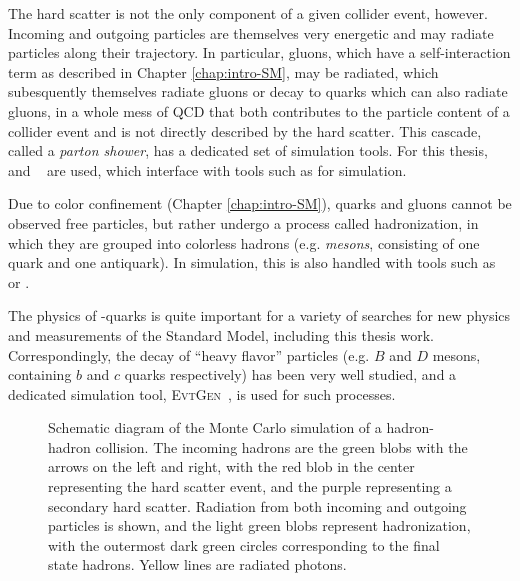 The hard scatter is not the only component of a given collider event, however. Incoming and outgoing 
particles are themselves very energetic and may radiate particles along their trajectory. In particular,
gluons, which have a self-interaction term as described in Chapter \ref{chap:intro-SM}, may be radiated,  
which subesquently themselves radiate gluons or decay to quarks which can also radiate gluons, in a 
whole mess of QCD that both contributes to the particle content of a collider event and is not directly 
described by the hard scatter. This cascade, called a \emph{parton shower}, has a dedicated set of simulation
tools. For this thesis, \HERWIG[7]~\cite{Herwig7}\cite{HerwigPP} and \PYTHIA[8]~\cite{Pythia} are used, which 
interface with tools such as \MADGRAPH for simulation. 

Due to color confinement (Chapter \ref{chap:intro-SM}), quarks and gluons cannot be observed free particles, but 
rather undergo a process called hadronization, in which they are grouped into colorless hadrons (e.g. \emph{mesons},
consisting of one quark and one antiquark). In simulation, this is also handled with tools such as \HERWIG[7] or \PYTHIA[8].

The physics of \Pqb-quarks is quite important for a variety of searches for new physics and measurements of 
the Standard Model, including this thesis work. Correspondingly, the decay of ``heavy flavor'' particles 
(e.g. $B$ and $D$ mesons, containing $b$ and $c$ quarks respectively) has been very well studied, and 
a dedicated simulation tool, \textsc{EvtGen}~\cite{EvtGen}, is used for such processes.

\begin{figure}[ht]
\centering
{}
\caption{\label{fig:parton-shower} Schematic diagram of the Monte Carlo simulation of a hadron-hadron collision. The 
incoming hadrons are the green blobs with the arrows on the left and right, with the red blob in the center 
representing the hard scatter event, and the purple representing a secondary hard scatter. Radiation from 
both incoming and outgoing particles is shown, and the light green blobs represent hadronization, with the outermost 
dark green circles corresponding to the final state hadrons. Yellow lines are radiated photons. ~\cite{parton-shower}}
\end{figure}

